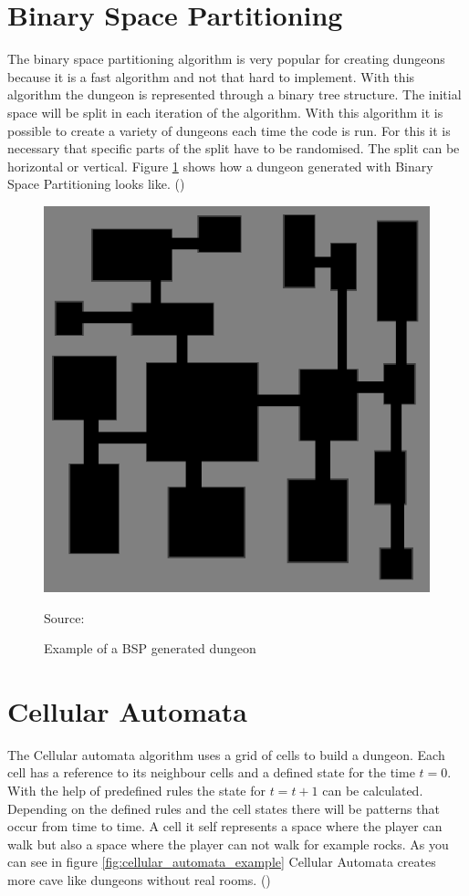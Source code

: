 \documentclass[a4paper,12pt,oneside]{scrreprt}
\begin{document}
\section{Binary Space Partitioning}
The binary space partitioning algorithm is very popular for creating dungeons because it is a fast algorithm and not that hard to implement. With this algorithm the dungeon is represented through a binary tree structure. The initial space will be split in each iteration of the algorithm. With this algorithm it is possible to create a variety of dungeons each time the code is run. For this it is necessary that specific parts of the split have to be randomised. The split can be horizontal or vertical. Figure \ref{fig:bsp_example} shows how a dungeon generated with Binary Space Partitioning looks like. (\cite[][]{williams_investigation_nodate})

\begin{figure}[htb]
\centering
\includegraphics[scale=0.5]{images/bsp_example.png} 
\caption{Example of a BSP generated dungeon}
Source: \cite[][]{williams_investigation_nodate}
\label{fig:bsp_example}
\end{figure}

\newpage
\section{Cellular Automata}
The Cellular automata algorithm uses a grid of cells to build a dungeon. Each cell has a reference to its neighbour cells and a defined state for the time $t = 0$. With the help of predefined rules the state for $t = t + 1$ can be calculated. Depending on the defined rules and the cell states there will be patterns that occur from time to time. A cell it self represents a space where the player can walk but also a space where the player can not walk for example rocks. As you can see in figure \ref{fig:cellular_automata_example} Cellular Automata creates more cave like dungeons without real rooms. (\cite[][]{williams_investigation_nodate})
\end{document}
